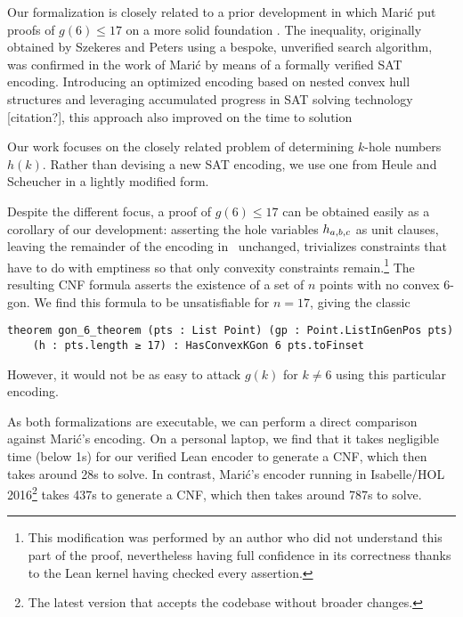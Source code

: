 Our formalization is closely related to a prior development
in which Marić put proofs of $g(6) \leq 17$ on a more solid foundation \cite{19maric_fast_formal_proof_erdos_szekeres_conjecture_convex_polygons_most_six_points}.
The inequality,
originally obtained by Szekeres and Peters \cite{06szekeres_computer_solution_17_point_erdos_szekeres_problem}
using a bespoke, unverified search algorithm,
was confirmed in the work of Marić
by means of a formally verified SAT encoding.
Introducing an optimized encoding based on nested convex hull structures
and leveraging accumulated progress in SAT solving technology [citation?],
this approach also improved on the time to solution

Our work focuses on the closely related problem
of determining $k$-hole numbers $h(k)$.
Rather than devising a new SAT encoding,
we use one from Heule and Scheucher \cite{emptyHexagonNumber}
in a lightly modified form.

Despite the different focus,
a proof of $g(6) \leq 17$ can be obtained easily
as a corollary of our development:
asserting the hole variables $\hvar_{a,b,c}$ as unit clauses,
leaving the remainder of the encoding in~ unchanged,
trivializes constraints that have to do with emptiness
so that only convexity constraints remain.\footnote{
This modification was performed by an author
who did not understand this part of the proof,
nevertheless having full confidence in its correctness
thanks to the Lean kernel having checked every assertion.}
The resulting CNF formula
asserts the existence of a set of $n$ points
with no convex $6$-gon.
We find this formula to be unsatisfiable for $n = 17$,
giving the classic
\begin{lstlisting}
theorem gon_6_theorem (pts : List Point) (gp : Point.ListInGenPos pts)
    (h : pts.length ≥ 17) : HasConvexKGon 6 pts.toFinset
\end{lstlisting}
However, it would not be as easy
to attack $g(k)$ for $k \neq 6$ using this particular encoding.

As both formalizations are executable,
we can perform a direct comparison against Marić's encoding.
On a personal laptop,
we find that it takes negligible time (below 1s)
for our verified Lean encoder to generate a CNF,
which then takes around 28s to solve.
In contrast,
Marić's encoder running in Isabelle/HOL 2016\footnote{
The latest version that accepts the codebase
without broader changes.}
takes 437s to generate a CNF,
which then takes around 787s to solve.

